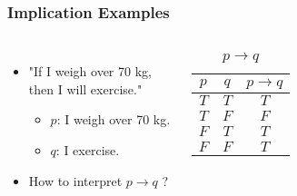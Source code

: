 \documentclass[dvipsnames]{beamer}
\begin{document}
\begin{frame}
  \frametitle{Implication Examples}

  \begin{example}
    \begin{columns}
      \begin{itemize}
        \item "If I weigh over 70 kg, then I will exercise."
        \begin{itemize}
          \item $p$: I weigh over 70 kg.
          \item $q$: I exercise.
        \end{itemize}

        \pause
        \item How to interpret $p \rightarrow q$ ?
      \end{itemize}

      \begin{table}
        \caption{$p \rightarrow q$}
        \begin{tabular}{|c|c||c|}\hline
          $p$ & $q$ & $p \rightarrow q$\\\hline\hline
          $T$ & $T$ & $T$              \\\hline
          $T$ & $F$ & $F$              \\\hline
          $F$ & $T$ & $T$              \\\hline
          $F$ & $F$ & $T$              \\\hline
        \end{tabular}
      \end{table}
    \end{columns}
  \end{example}
\end{frame}
\end{document}
